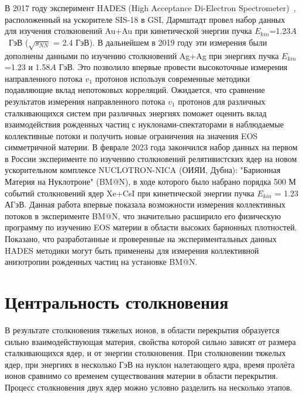 В 2017 году эксперимент HADES (High Acceptance Di-Electron Spectrometer)~\cite{HADES:2009aat}, расположенный на ускорителе SIS-18 в GSI, Дармштадт провел набор данных для изучения  столкновений Au+Au  при кинетической энергии пучка $E_{kin}$=1.23$A$~ГэВ ($\sqrt{s_{NN}}$ = 2.4 ГэВ).
В дальнейшем в 2019 году эти измерения были дополнены данными по изучению столкновений Ag+Ag при энергиях пучка $E_{kin}$=1.23 и 1.58$A$ ГэВ.
Это позволило впервые провести высокоточные измерения направленного потока $v_1$ протонов используя современные методики подавляющие вклад непотоковых корреляций.  
Ожидается, что сравнение результатов измерения направленного потока $v_1$ протонов для различных сталкивающихся систем при различных энергиях поможет  оценить вклад взаимодействия рожденных частиц с нуклонами-спектаторами в наблюдаемые коллективные  потоки и получить новые ограничения на значения EOS симметричной материи.
В феврале 2023 года закончился набор данных на первом в России эксперименте по изучению столкновений релятивистских ядер на новом ускорительном комплексе NUCLOTRON-NICA (ОИЯИ, Дубна): "Барионная Материя на Нуклотроне" (BM@N), в ходе которого было набрано порядка 500 М событий столкновений ядер Xe+CsI при кинетической энергии пучка  $E_{kin}$ = 1.23 АГэВ. Данная работа впервые показала возможности измерения коллективных потоков
в эксперименте BM@N,  что значительно расширило его физическую программу по изучению EOS материи  в области высоких барионных плотностей.
Показано, что разработанные и проверенные на экспериментальных данных HADES методики могут быть применены для измерения коллективной анизотропии
рожденных частиц на установке BM@N.


\section{Центральность столкновения}

В результате столкновения тяжелых ионов, в области перекрытия образуется сильно взаимодействующая материя, свойства которой сильно зависят от размера сталкивающихся ядер, и от энергии столкновения.
При столкновении тяжелых ядер, при энергиях в несколько ГэВ на нуклон налетающего ядра, время пролёта ионов сравнимо со временем существования материи в области перекрытия.
Процесс столкновения двух ядер можно условно разделить на несколько этапов.

